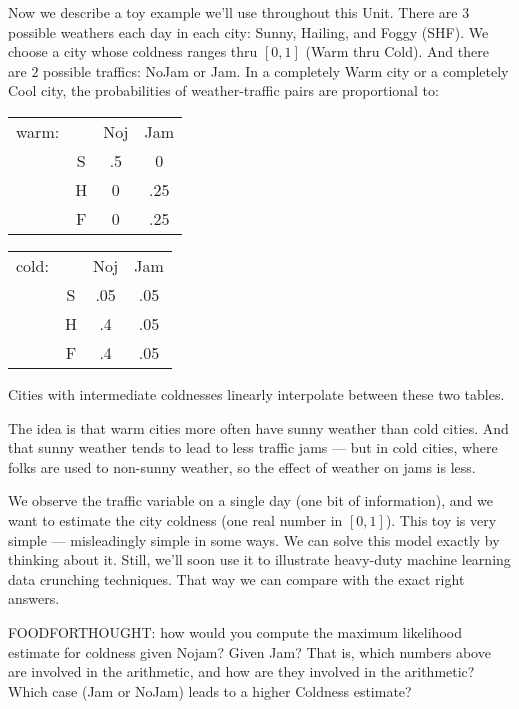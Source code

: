 %
Now we describe a toy example we'll use throughout this Unit.  There are $3$
possible weathers each day in each city: Sunny, Hailing, and Foggy (SHF).  We
choose a city whose coldness ranges thru $[0,1]$ (Warm thru Cold).  And there
are $2$ possible traffics: NoJam or Jam.   In a completely Warm city or a
completely Cool city, the probabilities of weather-traffic pairs are
proportional to:
%
  \begin{table}[h!]
      \centering
      \begin{tabular}{cccc}
          warm:&  &Noj & Jam \\%
              & S& .5 & 0 \\
              & H& 0  &.25\\
              & F& 0  &.25
      \end{tabular}
      \hspace{2cm}%
      \begin{tabular}{cccc}
          cold:& & Noj & Jam \\%
             &S&.05 &.05\\
             &H&.4  &.05\\
             &F&.4  &.05
      \end{tabular}
  \end{table}
Cities with intermediate coldnesses linearly interpolate between these two tables.

The idea is that warm cities more often have sunny weather than cold cities.
And that sunny weather tends to lead to less traffic jams ---
but in cold cities, where folks are used to non-sunny weather, so the effect
of weather on jams is less.


We observe the traffic variable on a single day (one bit of information), and
we want to estimate the city coldness (one real number in $[0,1]$).  This toy
is very simple --- misleadingly simple in some ways.
%
We can solve this model exactly by thinking about it.  Still, we'll soon use it
to illustrate heavy-duty machine learning data crunching techniques.  That way
we can compare with the exact right answers.

FOODFORTHOUGHT: how would you compute the maximum likelihood estimate for
coldness given Nojam?  Given Jam?  That is, which numbers above are involved
in the arithmetic, and how are they involved in the arithmetic?  Which case
(Jam or NoJam) leads to a higher Coldness estimate?

